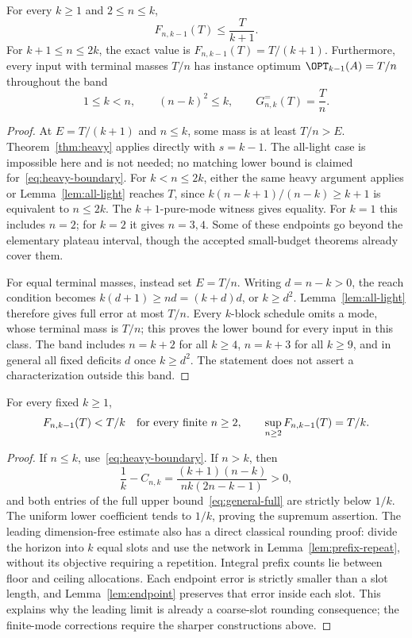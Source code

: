 \begin{corollary}
\label{cor:light-boundaries}
For every $k\ge1$ and $2\le n\le k$,
\begin{equation}\label{eq:heavy-boundary}
 F_{n,k-1}(T)\le\frac{T}{k+1}.
\end{equation}
For $k+1\le n\le2k$, the exact value is $F_{n,k-1}(T)=T/(k+1)$.
Furthermore, every input with terminal masses $T/n$ has instance optimum
$\OPT_{k-1}(A)=T/n$ throughout the band
\begin{equation}\label{eq:equal-mass-band}
 1\le k<n,\qquad (n-k)^2\le k,
 \qquad G^=_{n,k}(T)=\frac Tn.
\end{equation}
\end{corollary}
\begin{proof}
At $E=T/(k+1)$ and $n\le k$, some mass is at least
$T/n>E$. Theorem~\ref{thm:heavy} applies directly with $s=k-1$.
The all-light case is impossible here and is not needed; no matching
lower bound is claimed for~\eqref{eq:heavy-boundary}.
For $k<n\le2k$, either the same heavy argument applies or
Lemma~\ref{lem:all-light} reaches $T$, since
$k(n-k+1)/(n-k)\ge k+1$ is equivalent to $n\le2k$.
The $k+1$-pure-mode witness gives equality. For $k=1$ this includes
$n=2$; for $k=2$ it gives $n=3,4$. Some of these endpoints go beyond
the elementary plateau interval, though the accepted small-budget
theorems already cover them.

For equal terminal masses, instead set $E=T/n$. Writing $d=n-k>0$,
the reach condition becomes $k(d+1)\ge nd=(k+d)d$, or $k\ge d^2$.
Lemma~\ref{lem:all-light} therefore gives full error at most $T/n$.
Every $k$-block schedule omits a mode, whose terminal mass is $T/n$;
this proves the lower bound for every input in this class. The band
includes $n=k+2$ for all $k\ge4$, $n=k+3$ for all $k\ge9$, and in
general all fixed deficits $d$ once $k\ge d^2$. The statement does
not assert a characterization outside this band.
\end{proof}

\begin{proposition}\label{prop:dimension-free}
For every fixed $k\ge1$,
\[
 F_{n,k-1}(T)<T/k\quad\hbox{for every finite }n\ge2,
 \qquad \sup_{n\ge2}F_{n,k-1}(T)=T/k.
\]
\end{proposition}
\begin{proof}
If $n\le k$, use~\eqref{eq:heavy-boundary}. If $n>k$, then
\[
 \frac1k-C_{n,k}
 =\frac{(k+1)(n-k)}{nk(2n-k-1)}>0,
\]
and both entries of the full upper bound~\eqref{eq:general-full} are
strictly below $1/k$. The uniform lower coefficient tends to $1/k$,
proving the supremum assertion. The leading dimension-free estimate also
has a direct classical rounding proof: divide the horizon into $k$ equal
slots and use the network in Lemma~\ref{lem:prefix-repeat}, without its
objective requiring a repetition. Integral prefix counts lie between
floor and ceiling allocations. Each endpoint error is strictly smaller
than a slot length, and Lemma~\ref{lem:endpoint} preserves that error
inside each slot. This explains why the leading limit is already a
coarse-slot rounding consequence; the finite-mode corrections require
the sharper constructions above.
\end{proof}

